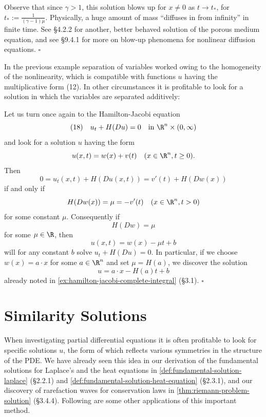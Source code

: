\begin{remark}
\label{rem:porous-medium-blowup-remark}
Observe that since $\gamma > 1$, this solution blows up for $x \neq 0$ as $t \to t_*$, for $t_* := \frac{1}{(\gamma-1)\mu}$. Physically, a huge amount of mass ``diffuses in from infinity'' in finite time. See \S4.2.2 for another, better behaved solution of the porous medium equation, and see \S9.4.1 for more on blow-up phenomena for nonlinear diffusion equations.
$\square$
\end{remark}

In the previous example separation of variables worked owing to the homogeneity of the nonlinearity, which is compatible with functions $u$ having the multiplicative form (12). In other circumstances it is profitable to look for a solution in which the variables are separated additively:

\begin{example}
\label{ex:hamilton-jacobi-additive-separation}
Let us turn once again to the Hamilton-Jacobi equation
$$(18) \quad u_t + H(Du) = 0 \quad \text{in } \R^n \times (0, \infty)$$
and look for a solution $u$ having the form
$$u(x,t) = w(x) + v(t) \quad (x \in \R^n, t \geq 0).$$
Then
$$0 = u_t(x,t) + H(Du(x,t)) = v'(t) + H(Dw(x))$$
if and only if
$$H(Dw(x)) = \mu = -v'(t) \quad (x \in \R^n, t > 0)$$
for some constant $\mu$. Consequently if
$$H(Dw) = \mu$$
for some $\mu \in \R$, then
$$u(x,t) = w(x) - \mu t + b$$
will for any constant $b$ solve $u_t + H(Du) = 0$. In particular, if we choose $w(x) = a \cdot x$ for some $a \in \R^n$ and set $\mu = H(a)$, we discover the solution
$$u = a \cdot x - H(a)t + b$$
already noted in \cref{ex:hamilton-jacobi-complete-integral} (\S3.1).
$\square$
\end{example}

\section{Similarity Solutions}
\label{sec:similarity-solutions}

When investigating partial differential equations it is often profitable to look for specific solutions $u$, the form of which reflects various symmetries in the structure of the PDE. We have already seen this idea in our derivation of the fundamental solutions for Laplace's and the heat equations in \cref{def:fundamental-solution-laplace} (\S2.2.1) and \cref{def:fundamental-solution-heat-equation} (\S2.3.1), and our discovery of rarefaction waves for conservation laws in \cref{thm:riemann-problem-solution} (\S3.4.4). Following are some other applications of this important method.

